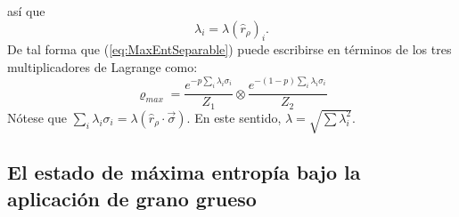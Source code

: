 así que
\begin{equation*}
  \lambda_{i}=\lambda(\hat{r}_{\rho})_{i}.
\end{equation*}
De tal forma que (\ref{eq:MaxEntSeparable}) puede escribirse en términos de los tres multiplicadores de Lagrange como:
\begin{equation}\label{eq:MaxEntSeparableLM}
  \boxed{\varrho_{max}=\frac{e^{-p\sum_{i}\lambda_{i}\sigma_{i}}}{Z_{1}} \otimes \frac{e^{-(1-p)\sum_{i}\lambda_{i}\sigma_{i}}}{Z_{2}}}
\end{equation}
Nótese que $\sum_{i}\lambda_{i}\sigma_{i}=\lambda(\hat{r}_{\rho}\cdot\vec{\sigma})$. En este sentido, $\lambda=\sqrt{\sum \lambda_{i}^{2}}$. 
\subsection{El estado de máxima entropía bajo la aplicación de grano grueso}\label{sec:CG(MaxEnt)}

